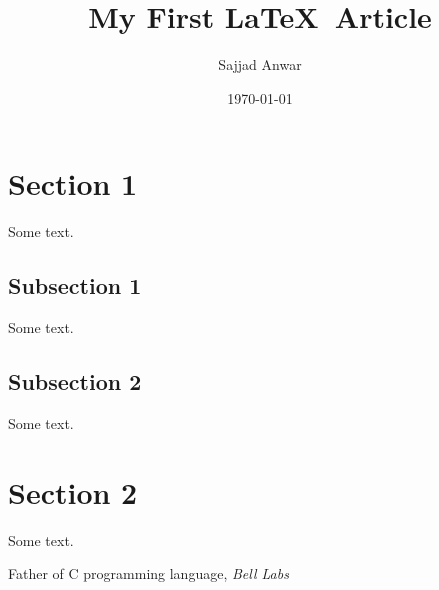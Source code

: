\documentclass{article}
\title{My First \LaTeX\ Article}
\author{Sajjad Anwar}
\date{\today}
\begin{document}
\maketitle
\newpage
\tableofcontents
\newpage
\section{Section 1}
Some text.
\subsection{Subsection 1}
Some text.\cite{dennis}
\subsection*{Subsection 2}
Some text.
\section{Section 2}
Some text.
\newpage
\begin{thebibliography}{Dennis, 1993}
Father of C programming language,
\emph{Bell Labs}
\end{thebibliography}
\end{document}

